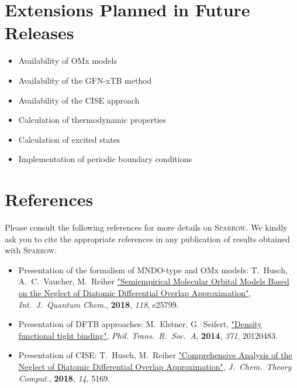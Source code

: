 \documentclass[]{tufte-book}
\begin{document}
\chapter{Extensions Planned in Future Releases}
\begin{itemize}
\item Availability of OMx models
\item Availability of the GFN-xTB method
\item Availability of the CISE approach
\item Calculation of thermodynamic properties
\item Calculation of excited states
\item Implementation of periodic boundary conditions
\end{itemize}



\chapter{References}

Please consult the following references for more details on \textsc{Sparrow}.
We kindly ask you to cite the appropriate references in any publication of results obtained with \textsc{Sparrow}.
\vspace{1.0cm}

\begin{itemize}
 \item Presentation of the formalism of MNDO-type and OMx models: \newline
T.~Husch, A.~C.~Vaucher, M.~Reiher \href{https://doi.org/10.1002/qua.25799}{"Semiempirical Molecular Orbital Models Based on the Neglect of Diatomic Differential Overlap Approximation"}, \textit{Int.~J.~Quantum Chem.}, \textbf{2018}, \textit{118}, e25799.
\item Presentation of DFTB approaches: \newline
M.~Elstner, G.~Seifert, \href{https://doi.org/10.1098/rsta.2012.0483}{"Density functional tight binding"}, \textit{Phil. Trans.~R.~Soc.~A}, \textbf{2014}, \textit{371}, 20120483.
\item Presentation of CISE: \newline
T.~Husch, M.~Reiher \href{https://doi.org/10.1021/acs.jctc.8b00601}{"Comprehensive Analysis of the Neglect of Diatomic Differential Overlap Approximation"}, \textit{J.~Chem.~Theory Comput.}, \textbf{2018}, \textit{14}, 5169.
\end{itemize}





\end{document}
